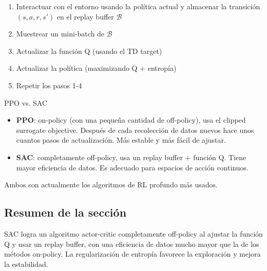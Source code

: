 \begin{enumerate}
    \item Interactuar con el entorno usando la política actual y almacenar la transición $(s, a, r, s')$ en el replay buffer $\mathcal{B}$
    \item Muestrear un mini-batch de $\mathcal{B}$
    \item Actualizar la función Q (usando el TD target)
    \item Actualizar la política (maximizando Q + entropía)
    \item Repetir los pasos 1-4
\end{enumerate}

\begin{importantbox}{PPO vs. SAC}
\begin{itemize}
    \item \textbf{PPO}: on-policy (con una pequeña cantidad de off-policy), usa el clipped surrogate objective. Después de cada recolección de datos nuevos hace unos cuantos pasos de actualización. Más estable y más fácil de ajustar.
    \item \textbf{SAC}: completamente off-policy, usa un replay buffer + función Q. Tiene mayor eficiencia de datos. Es adecuado para espacios de acción continuos.
\end{itemize}
Ambos son actualmente los algoritmos de RL profundo más usados.
\end{importantbox}

\subsection{Resumen de la sección}

SAC logra un algoritmo actor-critic completamente off-policy al ajustar la función Q y usar un replay buffer, con una eficiencia de datos mucho mayor que la de los métodos on-policy. La regularización de entropía favorece la exploración y mejora la estabilidad.

